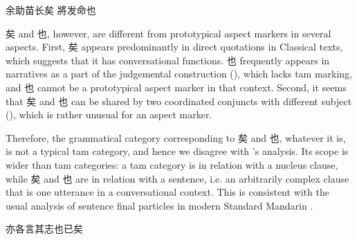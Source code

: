 \documentclass[UTF8, a4paper, oneside, scheme=plain, 12pt]{ctexrep}
\begin{document}
\begin{exe}
    \ex\label{ex:grammatical.clause.force.sentential-aspect.yi.1} 余助苗长矣
    \ex\label{ex:grammatical.clause.force.sentential-aspect.ye.1} 將发命也
\end{exe}

矣 and 也, however, are different from prototypical aspect markers in several aspects.
First, 矣 appears predominantly in direct quotations in Classical texts,
which suggests that it has conversational functions.
也 frequently appears in narratives as a part of the judgemental construction
(),
which lacks \ac{tam} marking, and 也 cannot be a prototypical aspect marker in that context.
Second, it seems that 矣 and 也 can be shared by two coordinated conjuncts with different subject (),
which is rather unusual for an aspect marker.

Therefore, the grammatical category corresponding to 矣 and 也, whatever it is,
is not a typical \ac{tam} category,
and hence we disagree with \citet{meiguang2018}'s analysis.
Its scope is wider than \ac{tam} categories:
a \ac{tam} category is in relation with a nucleus clause,
while 矣 and 也 are in relation with a sentence,
i.e. an arbitrarily complex clause that is one utterance in a conversational context.
This is consistent with the usual analysis of sentence final particles 
in modern Standard Mandarin
\citep{paul2014particles,pan2021sentence}.

\begin{exe}
    \ex 亦各言其志也已矣
\end{exe}
\end{document}
